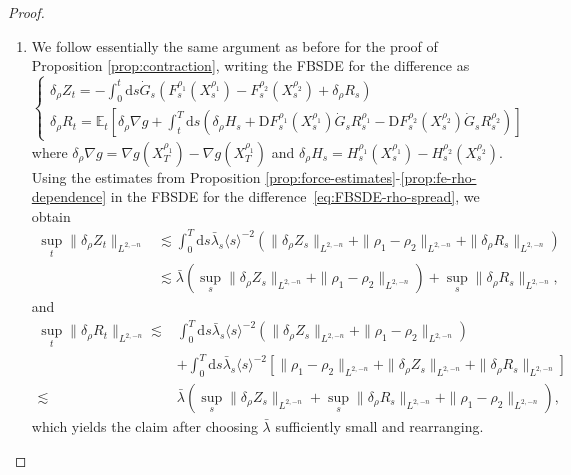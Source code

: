 \documentclass[11pt, a4paper]{scrartcl}
\numberwithin{equation}{section}
\theoremstyle{plain}
\theoremstyle{remark}
\newcommand{\mathD}{\mathrm{D}}
\newcommand{\mathd}{\mathrm{d}}
\newenvironment{enumeratealpha}{\begin{enumerate}[a{\textup{)}}] }{\end{enumerate}}
\begin{document}
\begin{proof}

	\begin{enumeratealpha}
		\item We follow essentially the same argument as before for the proof of
		Proposition \ref{prop:contraction}, writing the FBSDE for the difference
		as
		\begin{equation}
			\begin{cases}
				\delta_{\rho} Z_t = - \int_0^t \mathd s \dot{G}_s (F_s^{\rho_1}
				(X^{\rho_1}_s) - F_s^{\rho_2} (X_s^{\rho_2}) + \delta_{\rho} R_s) \\
				\delta_{\rho} R_t =\mathbb{E}_t \left[ \delta_{\rho} \nabla g +
					\int_t^T \mathd s \left(\delta_{\rho} H_s + \mathD
					F_s^{\rho_1} \left( X_s^{\rho_1} \right)  \dot{G}_s R_s^{\rho_1} -
					\mathD F_s^{\rho_2} (X_s^{\rho_2})  \dot{G}_s R_s^{\rho_2} \right)
					\right]
			\end{cases} \label{eq:FBSDE-rho-spread}
		\end{equation}
		where $\delta_{\rho} \nabla g = \nabla g (X^{\rho_1}_T) - \nabla g
			(X^{\rho_1}_T)$ and $\delta_{\rho} H_s = H_s^{\rho_1} (X^{\rho_1}_s) -
			H_s^{\rho_2} (X^{\rho_2}_s)$. Using the estimates from Proposition
		\ref{prop:force-estimates}-\ref{prop:fe-rho-dependence} in the FBSDE for
		the difference~\eqref{eq:FBSDE-rho-spread}, we obtain
		\[ \begin{aligned}
				\sup_t \| \delta_{\rho} Z_t \|_{L^{2, - n}} & \lesssim  \int_0^T
				\mathd s \bar{\lambda}_s \langle s \rangle^{- 2} (\| \delta_{\rho} Z_s
				\|_{L^{2, - n}} + \| \rho_1 - \rho_2 \|_{L^{2, - n}} + \|
				\delta_{\rho} R_s \|_{L^{2, - n}})                                                                                   \\
				                                            & \lesssim  \bar{\lambda} (\sup_s \| \delta_{\rho} Z_s \|_{L^{2, - n}} +
				\| \rho_1 - \rho_2 \|_{L^{2, - n}}) + \sup_s \| \delta_{\rho} R_s
				\|_{L^{2, - n}},
			\end{aligned} \]
		and
		\[ \begin{aligned}
				\sup_t \| \delta_{\rho} R_t \|_{L^{2, - n}} \lesssim & \int_0^T
				\mathd s \bar{\lambda}_s \langle s \rangle^{- 2} (\| \delta_{\rho} Z_s
				\|_{L^{2, - n}} + \| \rho_1 - \rho_2 \|_{L^{2, - n}})                                                                  \\
				                                                     & + \int_0^T \mathd s \bar{\lambda}_s \langle s \rangle^{- 2} [\|
					\rho_1 - \rho_2 \|_{L^{2, - n}} + \| \delta_{\rho} Z_s \|_{L^{2, -
				n}} + \| \delta_{\rho} R_s \|_{L^{2, - n}}]                                                                            \\
				\lesssim                                             & \bar{\lambda} (\sup_s \| \delta_{\rho} Z_s \|_{L^{2, - n}} +
				\sup_s \| \delta_{\rho} R_s \|_{L^{2, - n}} + \| \rho_1 - \rho_2
				\|_{L^{2, - n}}),
			\end{aligned} \]
		which yields the claim after choosing $\bar{\lambda}$ sufficiently small and
		rearranging.


\end{enumeratealpha}
\end{proof}
\end{document}
